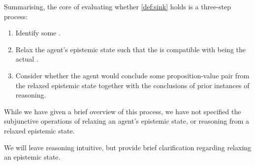 \begin{note}
  Summarising, the core of evaluating whether \autoref{def:sink} holds is a three-step process:
  \begin{enumerate}[label=\Alph*., ref=\Alph*]
  \item
    \label{ideaS:sink:step:A}
    Identify some \epPAd{} \world{}.
  \item
    \label{ideaS:sink:step:B}
    Relax the agent's epistemic state such that the \epPAd{} \world{} is compatible with being the actual \world{}.
  \item
    \label{ideaS:sink:step:C}
    Consider whether the agent would conclude some proposition-value pair from the relaxed epistemic state together with the conclusions of prior instances of reasoning.
  \end{enumerate}
  While we have given a brief overview of this process, we have not specified the subjunctive operations of relaxing an agent's epistemic state, or reasoning from a relaxed epistemic state.

  We will leave reasoning intuitive, but provide brief clarification regarding relaxing an epistemic state.
\end{note}

